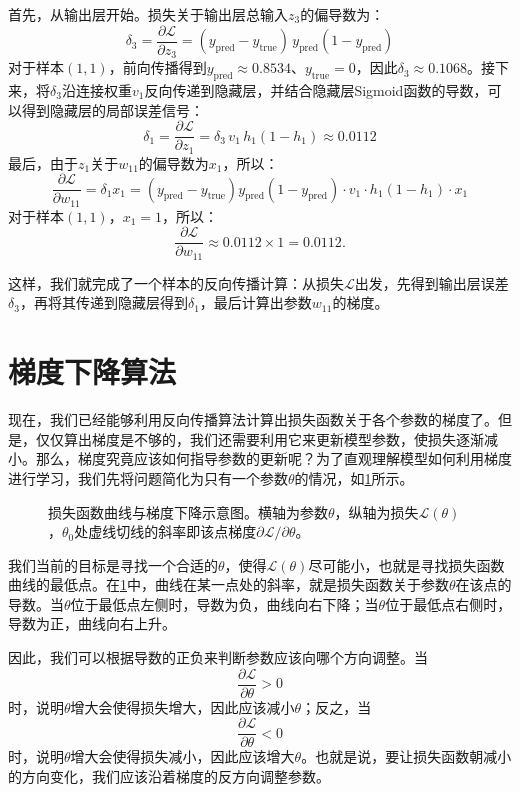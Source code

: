 首先，从输出层开始。损失关于输出层总输入$z_3$的偏导数为：
$$
\delta_3=\frac{\partial\mathcal{L}}{\partial z_3}=(y_{\text{pred}}-y_{\text{true}})\,y_{\text{pred}}(1-y_{\text{pred}})
$$
对于样本$(1,1)$，前向传播得到$y_{\text{pred}}\approx0.8534$、$y_{\text{true}}=0$，因此$\delta_3\approx0.1068$。接下来，将$\delta_3$沿连接权重$v_1$反向传递到隐藏层，并结合隐藏层Sigmoid函数的导数，可以得到隐藏层的局部误差信号：
$$
\delta_1=\frac{\partial\mathcal{L}}{\partial z_1}=\delta_3\,v_1\,h_1(1-h_1) \approx0.0112
$$
最后，由于$z_1$关于$w_{11}$的偏导数为$x_1$，所以：
$$
\frac{\partial\mathcal{L}}{\partial w_{11}}=\delta_1x_1 = (y_{\text{pred}}-y_{\text{true}})y_{\text{pred}}(1-y_{\text{pred}})\cdot v_1\cdot h_1(1-h_1)\cdot x_1
$$
对于样本$(1,1)$，$x_1=1$，所以：
$$
\frac{\partial\mathcal{L}}{\partial w_{11}}\approx0.0112\times1=0.0112.
$$

这样，我们就完成了一个样本的反向传播计算：从损失$\mathcal{L}$出发，先得到输出层误差$\delta_3$，再将其传递到隐藏层得到$\delta_1$，最后计算出参数$w_{11}$的梯度。

\section{梯度下降算法}

现在，我们已经能够利用反向传播算法计算出损失函数关于各个参数的梯度了。但是，仅仅算出梯度是不够的，我们还需要利用它来更新模型参数，使损失逐渐减小。那么，梯度究竟应该如何指导参数的更新呢？为了直观理解模型如何利用梯度进行学习，我们先将问题简化为只有一个参数$\theta$的情况，如\cref{fig:loss_function}所示。

\begin{figure}[H]
    \caption{损失函数曲线与梯度下降示意图。横轴为参数$\theta$，纵轴为损失$\mathcal{L}(\theta)$，$\theta_0$处虚线切线的斜率即该点梯度$\partial \mathcal{L}/\partial \theta$。}
    \label{fig:loss_function}
\end{figure}

我们当前的目标是寻找一个合适的$\theta$，使得$\mathcal{L}(\theta)$尽可能小，也就是寻找损失函数曲线的最低点。在\cref{fig:loss_function}中，曲线在某一点处的斜率，就是损失函数关于参数$\theta$在该点的导数。当$\theta$位于最低点左侧时，导数为负，曲线向右下降；当$\theta$位于最低点右侧时，导数为正，曲线向右上升。

因此，我们可以根据导数的正负来判断参数应该向哪个方向调整。当
$$
\frac{\partial\mathcal{L}}{\partial\theta}>0
$$
时，说明$\theta$增大会使得损失增大，因此应该减小$\theta$；反之，当
$$
\frac{\partial\mathcal{L}}{\partial\theta}<0
$$
时，说明$\theta$增大会使得损失减小，因此应该增大$\theta$。也就是说，要让损失函数朝减小的方向变化，我们应该沿着梯度的反方向调整参数。


